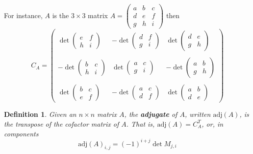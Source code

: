 \documentclass[12pt]{article}
\numberwithin{equation}{subsection}
\numberwithin{figure}{subsection}
\newtheorem{defn}[subsection]{Definition}
\theoremstyle{note}
\newcommand\adj[1]{\mathrm{adj}(#1)}
\begin{document}
For instance, $A$ is the $3\times 3$ matrix $A=\begin{pmatrix} a & b & c \\ d & e & f \\ g & h & i\end{pmatrix}$ then 
\[C_A=\begin{pmatrix} 
	\det \begin{pmatrix} e & f \\ h & i \end{pmatrix} & -\det \begin{pmatrix} d & f \\ g & i \end{pmatrix} & \det \begin{pmatrix} d & e \\ g & h \end{pmatrix} \\
	&&\\
	-\det \begin{pmatrix} b & c \\ h & i \end{pmatrix} & \det \begin{pmatrix} a & c \\ g & i \end{pmatrix} & -\det \begin{pmatrix} a & b \\ g & h \end{pmatrix}\\
	&&\\
	\det \begin{pmatrix} b & c \\ e & f \end{pmatrix} & -\det \begin{pmatrix} a & c \\ d & f \end{pmatrix} & \det \begin{pmatrix} a & b \\ d & e \end{pmatrix}
\end{pmatrix}\]
\begin{defn}Given an $n\times n$ matrix $A$, the \textbf{adjugate} of $A$, written $\adj{A}$, is the transpose of the cofactor matrix of $A$. That is, $\adj{A}=C_A^T$, or, in components \begin{equation} \adj{A}_{i,j}=(-1)^{i+j} \det{M_{j,i}}\end{equation}
\end{defn}
\end{document}
